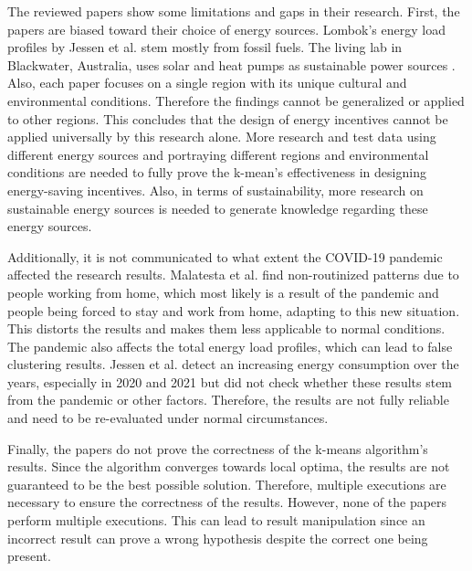 The reviewed papers show some limitations and gaps in their research.
First, the papers are biased toward their choice of energy sources.
Lombok's energy load profiles by Jessen et al. \cite{JES-IND} stem mostly from fossil fuels.
The living lab in Blackwater, Australia, uses solar and heat pumps as sustainable power sources \cite{MAL-HBP}.
Also, each paper focuses on a single region with its unique cultural and environmental conditions.
Therefore the findings cannot be generalized or applied to other regions.
This concludes that the design of energy incentives cannot be applied universally by this research alone.
More research and test data using different energy sources and portraying different regions and environmental conditions are needed to fully prove the k-mean's effectiveness in designing energy-saving incentives. 
Also, in terms of sustainability, more research on sustainable energy sources is needed to generate knowledge regarding these energy sources.

Additionally, it is not communicated to what extent the COVID-19 pandemic affected the research results.
Malatesta et al. \cite{MAL-HBP} find non-routinized patterns due to people working from home, which most likely is a result of the pandemic and people being forced to stay and work from home, adapting to this new situation.
This distorts the results and makes them less applicable to normal conditions.
The pandemic also affects the total energy load profiles, which can lead to false clustering results.
Jessen et al. \cite{JES-IND} detect an increasing energy consumption over the years, especially in 2020 and 2021 but did not check whether these results stem from the pandemic or other factors.
Therefore, the results are not fully reliable and need to be re-evaluated under normal circumstances.

Finally, the papers do not prove the correctness of the k-means algorithm's results.
Since the algorithm converges towards local optima, the results are not guaranteed to be the best possible solution.
Therefore, multiple executions are necessary to ensure the correctness of the results.
However, none of the papers perform multiple executions.
This can lead to result manipulation since an incorrect result can prove a wrong hypothesis despite the correct one being present.

